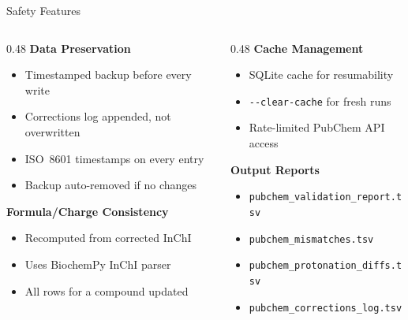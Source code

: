 \documentclass[aspectratio=169,11pt]{beamer}
\begin{document}
\begin{frame}{Safety Features}

\begin{columns}[T]
\begin{column}{0.48\textwidth}
\textbf{Data Preservation}
\begin{itemize}
  \item Timestamped backup before every write
  \item Corrections log appended, not overwritten
  \item ISO~8601 timestamps on every entry
  \item Backup auto-removed if no changes
\end{itemize}

\bigskip
\textbf{Formula/Charge Consistency}
\begin{itemize}
  \item Recomputed from corrected InChI
  \item Uses BiochemPy InChI parser
  \item All rows for a compound updated
\end{itemize}
\end{column}

\begin{column}{0.48\textwidth}
\textbf{Cache Management}
\begin{itemize}
  \item SQLite cache for resumability
  \item \texttt{-{}-clear-cache} for fresh runs
  \item Rate-limited PubChem API access
\end{itemize}

\bigskip
\textbf{Output Reports}
\begin{itemize}\footnotesize
  \item \texttt{pubchem\_validation\_report.tsv}
  \item \texttt{pubchem\_mismatches.tsv}
  \item \texttt{pubchem\_protonation\_diffs.tsv}
  \item \texttt{pubchem\_corrections\_log.tsv}
\end{itemize}
\end{column}
\end{columns}

\end{frame}
\end{document}
